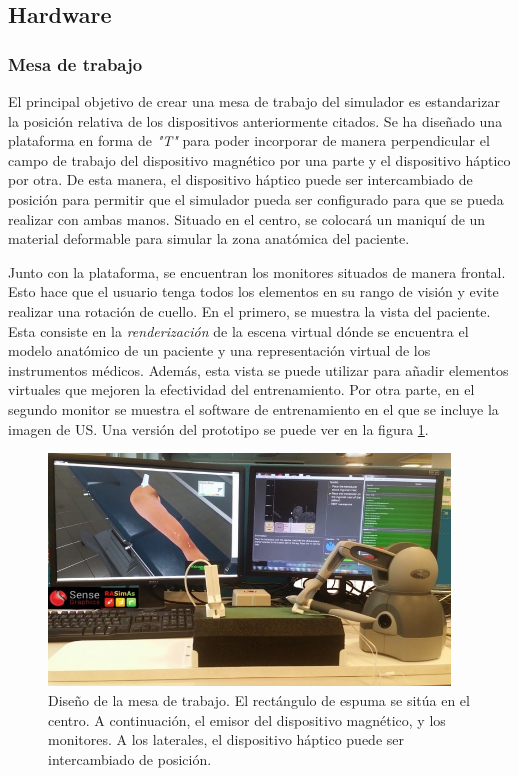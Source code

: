 \subsection{Hardware}


\subsubsection{Mesa de trabajo}

El principal objetivo de crear una mesa de trabajo del simulador es estandarizar la posición relativa de los dispositivos anteriormente citados. %
Se ha diseñado una plataforma en forma de \emph{"T"} para poder incorporar de manera perpendicular el campo de trabajo del dispositivo magnético por una parte y el dispositivo háptico por otra. De esta manera, el dispositivo háptico puede ser intercambiado de posición para permitir que el simulador pueda ser configurado para que se pueda realizar con ambas manos. Situado en el centro, se colocará un maniquí de un material deformable para simular la zona anatómica del paciente. 

Junto con la plataforma, se encuentran los monitores situados de manera frontal. Esto hace que el usuario tenga todos los elementos en su rango de visión y evite realizar una rotación de cuello. En el primero, se muestra la vista del paciente. Esta consiste en la \emph{renderización} de la escena virtual dónde se encuentra el modelo anatómico de un paciente y una representación virtual de los instrumentos médicos. Además, esta vista se puede utilizar para añadir elementos virtuales que mejoren la efectividad del entrenamiento. 
Por otra parte, en el segundo monitor se muestra el software de entrenamiento en el que se incluye la imagen de \ac{US}. Una versión del prototipo se puede ver en la figura \ref{fig:simulator}.


\begin{figure}[h]
    \centering
    \includegraphics[width=0.95\textwidth]{IMG/simulator.jpg}
    \caption{Diseño de la mesa de trabajo. El rectángulo de espuma se sitúa en el centro. A continuación, el emisor del dispositivo magnético, y los monitores. A los laterales, el dispositivo háptico puede ser intercambiado de posición.}
    \label{fig:simulator}
\end{figure}


